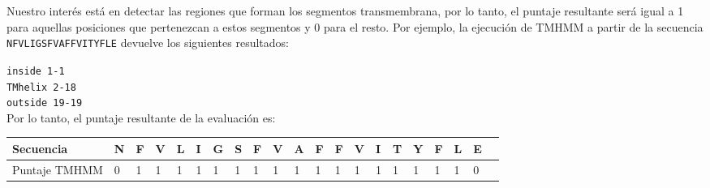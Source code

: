Nuestro interés está en detectar las regiones que forman los segmentos transmembrana, por lo tanto, el puntaje resultante será igual a 1 para aquellas posiciones que pertenezcan a estos segmentos y 0 para el resto. 
Por ejemplo, la ejecución de TMHMM a partir de la secuencia \texttt{NFVLIGSFVAFFVITYFLE} devuelve los siguientes resultados: 

\texttt{inside         1-1}\\
\indent \texttt{TMhelix   2-18}\\
\indent \texttt{outside	    19-19}\\

Por lo tanto, el puntaje resultante de la evaluación es:

\vspace{0.5cm}
\noindent
\begin{tabular}{lllllllllllllllllllll} 
\hline 
Secuencia & \textbf{N} & \textbf{F} & \textbf{V} & \textbf{L} & \textbf{I} & \textbf{G} & \textbf{S} & \textbf{F} & \textbf{V} & \textbf{A} & \textbf{F} & \textbf{F} & \textbf{V} & \textbf{I} & \textbf{T} & \textbf{Y} & \textbf{F} & \textbf{L} & \textbf{E}  \\ \hline
Puntaje TMHMM & 0 & 1 & 1 & 1 & 1 & 1 & 1 & 1 & 1 & 1 & 1 & 1 & 1 & 1 & 1 & 1 & 1 & 1 & 0\\ \hline
\end{tabular}



 
 
 
 



% 
% 


